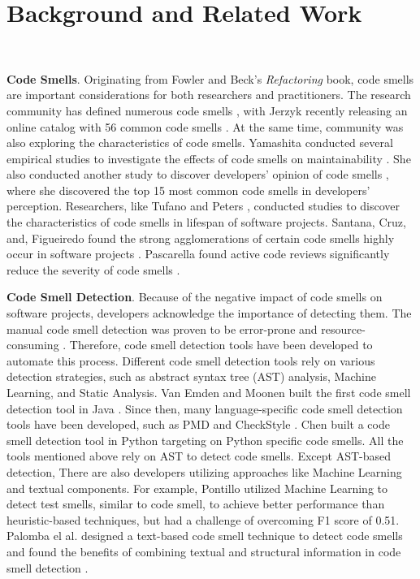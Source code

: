 \vspace*{-0.5em}

\section{Background and Related Work}~\label{sec:background}

\vspace*{-1em}


{\bf Code Smells}. Originating from Fowler and Beck's \textit{Refactoring} book,
code smells are important considerations for both researchers and practitioners.
The research community has defined numerous code smells
\cite{Pysmell,SQLAntipatterns,CleanCode,RefactoringWorkbook}, with Jerzyk
recently releasing an online catalog with 56 common code smells
\cite{Jerzyk2023}. At the same time, community was also exploring the
characteristics of code smells. Yamashita conducted several empirical studies to
investigate the effects of code smells on maintainability \cite{6392174}
\cite{6405287}. She also conducted another study to discover developers' opinion
of code smells \cite{developersCare}, where she discovered the top 15 most common
code smells in developers' perception. Researchers, like Tufano
\cite{whenandwhy} and Peters \cite{lifespan}, conducted studies to discover the
characteristics of code smells in lifespan of software projects. Santana, Cruz,
and, Figueiredo found the strong agglomerations of certain code smells highly
occur in software projects \cite{Santana}. Pascarella found active code reviews
significantly reduce the severity of code smells \cite{Pascarella}.

{\bf Code Smell Detection}. Because of the negative impact of code smells on
software projects, developers acknowledge the importance of detecting them. The
manual code smell detection was proven to be error-prone and resource-consuming
\cite{DetectingDefectsInObject}. Therefore, code smell detection tools have been
developed to automate this process. Different code smell detection tools rely on
various detection strategies, such as abstract syntax tree (AST) analysis,
Machine Learning, and Static Analysis. Van Emden and Moonen built the first code
smell detection tool in Java \cite{1173068}. Since then, many language-specific
code smell detection tools have been developed, such as PMD \cite{PMD} and
CheckStyle \cite{CheckStyle}. Chen \cite{Pysmell} built a code smell detection
tool in Python targeting on Python specific code smells. All the tools mentioned
above rely on AST to detect code smells. Except AST-based detection, There are
also developers utilizing approaches like Machine Learning and textual
components. For example, Pontillo utilized Machine Learning to detect test
smells, similar to code smell, to achieve better performance than
heuristic-based techniques, but had a challenge of overcoming F1 score of 0.51.
Palomba el al. designed a text-based code smell technique to detect code smells
and found the benefits of combining textual and structural information in code
smell detection \cite{Palomba}.

